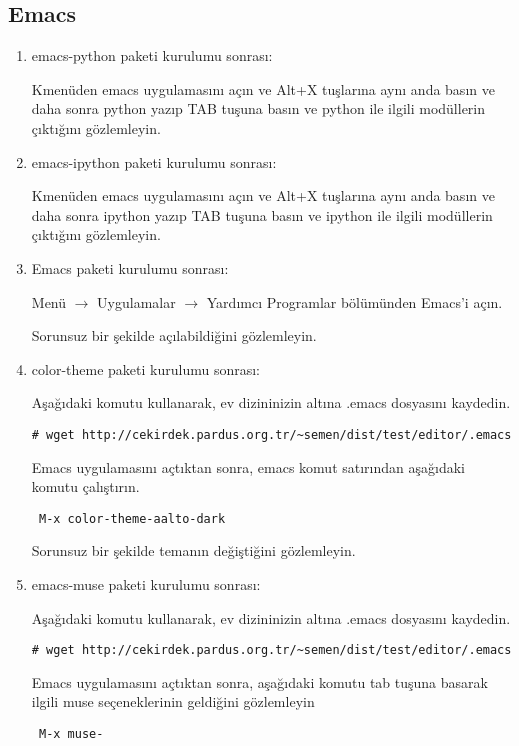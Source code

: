 \documentclass[a4paper,10pt]{article}
\begin{document}
\subsection*{Emacs}
\begin{enumerate}
\item emacs-python paketi kurulumu sonrası:

Kmenüden emacs uygulamasını açın ve Alt+X tuşlarına aynı anda basın ve daha sonra python yazıp TAB tuşuna basın ve python ile ilgili modüllerin çıktığını gözlemleyin.

\item emacs-ipython paketi kurulumu sonrası:

Kmenüden emacs uygulamasını açın ve Alt+X tuşlarına aynı anda basın ve daha sonra ipython yazıp TAB tuşuna basın ve ipython ile ilgili modüllerin çıktığını gözlemleyin.

\item Emacs paketi kurulumu sonrası:

Menü $\rightarrow$ Uygulamalar $\rightarrow$ Yardımcı Programlar bölümünden Emacs'i açın.

Sorunsuz bir şekilde açılabildiğini gözlemleyin.

\item color-theme paketi kurulumu sonrası:


Aşağıdaki komutu kullanarak, ev dizininizin altına .emacs dosyasını kaydedin.
\begin{verbatim}
# wget http://cekirdek.pardus.org.tr/~semen/dist/test/editor/.emacs 
\end{verbatim}

Emacs uygulamasını açtıktan sonra, emacs komut satırından aşağıdaki komutu çalıştırın.
\begin{verbatim}
 M-x color-theme-aalto-dark
\end{verbatim}

Sorunsuz bir şekilde temanın değiştiğini gözlemleyin.

\item emacs-muse paketi kurulumu sonrası:

Aşağıdaki komutu kullanarak, ev dizininizin altına .emacs dosyasını kaydedin.
\begin{verbatim}
# wget http://cekirdek.pardus.org.tr/~semen/dist/test/editor/.emacs 
\end{verbatim}

Emacs uygulamasını açtıktan sonra, aşağıdaki komutu tab tuşuna basarak ilgili muse seçeneklerinin geldiğini gözlemleyin
\begin{verbatim}
 M-x muse-
\end{verbatim}


\end{enumerate}
\end{document}
